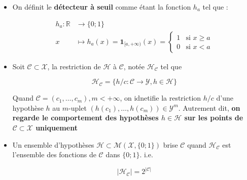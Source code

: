 \begin{itemize}

    \item On définit le \textbf{détecteur à seuil} comme étant la fonction $h_a$ tel que :

    \[
    \begin{aligned}
        h_a : \mathbb{R} &\to \{ 0;1 \} \\
        x &\mapsto h_a(x) = \mathbf{1}_{[a,+\infty)}(x) =
                    \begin{cases}
                    1 & \text{si } x \geq a \\
                    0 & \text{si } x < a
                    \end{cases}
    \end{aligned}
    \]


    \item Soit $\mathcal{C} \subset \mathcal{X}$, la restriction de $\mathcal{H}$ à $\mathcal{C}$, notée $\mathcal{H}_{\mathcal{C}}$ tel que 

    \begin{equation}
        \mathcal{H}_{\mathcal{C}} = \{ h/c : \mathcal{C} \rightarrow \mathcal{Y}, h \in \mathcal{H} \}
    \end{equation}

    \noindent Quand $\mathcal{C} = (c_1, \dots, c_m), m < +\infty$, on idnetifie la restriction $h/c$ d'une hypothèse $h$ au $m$-uplet $(h(c_1), \dots, h(c_m)) \in \mathcal{Y}^{m}$.
    Autrement dit, \textbf{on regarde le comportement des hypothèses $h \in \mathcal{H}$ sur les points de $\mathcal{C} \subset \mathcal{X}$ uniquement} \newline

    \item Un ensemble d'hypothèses $\mathcal{H} \subset \mathcal{M}(\mathcal{X}, \{0;1\})$ brise $\mathcal{C}$ quand $\mathcal{H}_{\mathcal{C}}$ est l'ensemble 
    des fonctions de $\mathcal{C}$ dans $\{0;1\}$. i.e.

    \begin{equation}
        |\mathcal{H}_{\mathcal{C}}| = 2^{|\mathcal{C}|}
    \end{equation}


\end{itemize}
